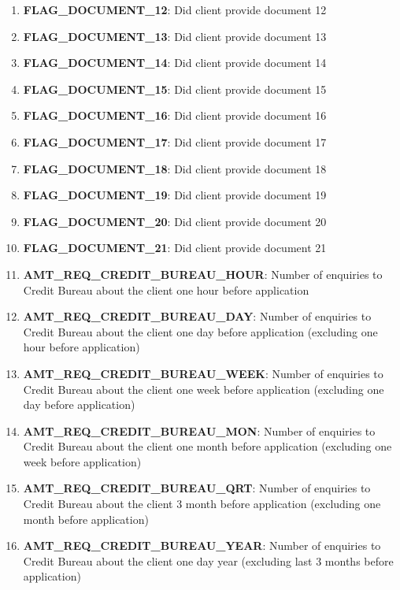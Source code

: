 \documentclass[12pt, letterpaper]{article}
\begin{document}
\begin{appendices}
\begin{enumerate}
  \item \textbf{FLAG_DOCUMENT_12}: Did client provide document 12
  \item \textbf{FLAG_DOCUMENT_13}: Did client provide document 13
  \item \textbf{FLAG_DOCUMENT_14}: Did client provide document 14
  \item \textbf{FLAG_DOCUMENT_15}: Did client provide document 15
  \item \textbf{FLAG_DOCUMENT_16}: Did client provide document 16
  \item \textbf{FLAG_DOCUMENT_17}: Did client provide document 17
  \item \textbf{FLAG_DOCUMENT_18}: Did client provide document 18
  \item \textbf{FLAG_DOCUMENT_19}: Did client provide document 19
  \item \textbf{FLAG_DOCUMENT_20}: Did client provide document 20
  \item \textbf{FLAG_DOCUMENT_21}: Did client provide document 21
  \item \textbf{AMT_REQ_CREDIT_BUREAU_HOUR}: Number of enquiries to Credit Bureau about the client one hour before application
  \item \textbf{AMT_REQ_CREDIT_BUREAU_DAY}: Number of enquiries to Credit Bureau about the client one day before application (excluding one hour before application)
  \item \textbf{AMT_REQ_CREDIT_BUREAU_WEEK}: Number of enquiries to Credit Bureau about the client one week before application (excluding one day before application)
  \item \textbf{AMT_REQ_CREDIT_BUREAU_MON}: Number of enquiries to Credit Bureau about the client one month before application (excluding one week before application)
  \item \textbf{AMT_REQ_CREDIT_BUREAU_QRT}: Number of enquiries to Credit Bureau about the client 3 month before application (excluding one month before application)
  \item \textbf{AMT_REQ_CREDIT_BUREAU_YEAR}: Number of enquiries to Credit Bureau about the client one day year (excluding last 3 months before application)
\end{enumerate}


\end{appendices}
\end{document}
